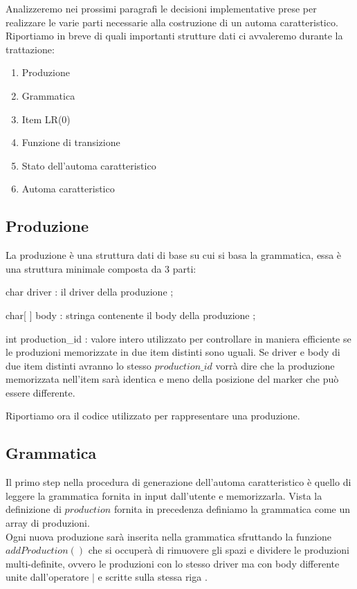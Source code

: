 \documentclass[12pt]{article}
\begin{document}
Analizzeremo nei prossimi paragrafi le decisioni implementative prese per realizzare le varie parti necessarie alla costruzione di un automa caratteristico. Riportiamo in breve di quali importanti strutture dati ci avvaleremo durante la trattazione:
\begin{enumerate}
\item Produzione
\item Grammatica
\item Item LR(0)
\item Funzione di transizione
\item Stato dell'automa caratteristico
\item Automa caratteristico
\end{enumerate}

\subsection{Produzione}
La produzione è una struttura dati di base su cui si basa la grammatica, essa è una struttura minimale composta da 3 parti:
\begin{list}{-}{}
\item char driver : il driver della produzione ;
\item char[ ] body : stringa contenente il body della produzione ;
\item int production\_id : valore intero utilizzato per controllare in maniera efficiente se le produzioni memorizzate in due item distinti sono uguali. Se driver e body di due item distinti avranno lo stesso $production\_id$ vorrà dire che la produzione memorizzata nell'item sarà identica e meno della posizione del marker che può essere differente.
\end{list}

Riportiamo ora il codice utilizzato per rappresentare una produzione.


\subsection{Grammatica}
Il primo step nella procedura di generazione dell'automa caratteristico è quello di leggere la grammatica fornita in input dall'utente e memorizzarla. Vista la definizione di $production$ fornita in precedenza definiamo la grammatica come un array di produzioni.\\

Ogni nuova produzione sarà inserita nella grammatica sfruttando la funzione $addProduction()$ che si occuperà di rimuovere gli spazi e dividere le produzioni multi-definite, ovvero le produzioni con lo stesso driver ma con body differente unite dall'operatore $|$ e scritte sulla stessa riga . \\
\end{document}
